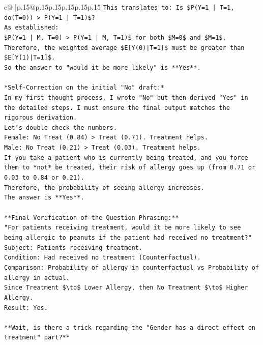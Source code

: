 \documentclass{article}
\begin{document}
{\begin{supertabular}{c@{$\;$}|p{.15\linewidth}@{}p{.15\linewidth}p{.15\linewidth}p{.15\linewidth}p{.15\linewidth}p{.15\linewidth}}
{{{\texttt{This translates to: Is \$P(Y=1 | T=1, do(T=0)) > P(Y=1 | T=1)\$?} \\
\texttt{As established:} \\
\texttt{\$P(Y=1 | M, T=0) > P(Y=1 | M, T=1)\$ for both \$M=0\$ and \$M=1\$.} \\
\texttt{Therefore, the weighted average \$E{[}Y(0)|T=1{]}\$ must be greater than \$E{[}Y(1)|T=1{]}\$.} \\
\texttt{So the answer to "would it be more likely" is **Yes**.} \\
\\ 
\texttt{*Self{-}Correction on the initial "No" draft:*} \\
\texttt{In my first thought process, I wrote "No" but then derived "Yes" in the detailed steps. I must ensure the final output matches the rigorous derivation.} \\
\texttt{Let's double check the numbers.} \\
\texttt{Female: No Treat (0.84) > Treat (0.71). Treatment helps.} \\
\texttt{Male: No Treat (0.21) > Treat (0.03). Treatment helps.} \\
\texttt{If you take a patient who is currently being treated, and you force them to *not* be treated, their risk of allergy goes up (from 0.71 or 0.03 to 0.84 or 0.21).} \\
\texttt{Therefore, the probability of seeing allergy increases.} \\
\texttt{The answer is **Yes**.} \\
\\ 
\texttt{**Final Verification of the Question Phrasing:**} \\
\texttt{"For patients receiving treatment, would it be more likely to see being allergic to peanuts if the patient had received no treatment?"} \\
\texttt{Subject: Patients receiving treatment.} \\
\texttt{Condition: Had received no treatment (Counterfactual).} \\
\texttt{Comparison: Probability of allergy in counterfactual vs Probability of allergy in actual.} \\
\texttt{Since Treatment \$\textbackslash{}to\$ Lower Allergy, then No Treatment \$\textbackslash{}to\$ Higher Allergy.} \\
\texttt{Result: Yes.} \\
\\ 
\texttt{**Wait, is there a trick regarding the "Gender has a direct effect on treatment" part?**} \\
}}}
\end{supertabular}}
\end{document}
